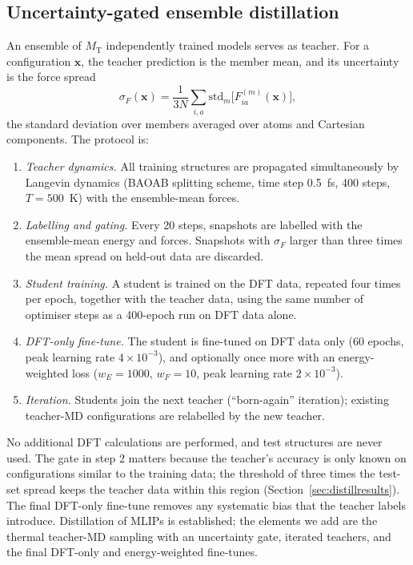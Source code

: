 \documentclass[journal=jctcce,manuscript=article,layout=traditional]{achemso}
\newcommand{\vect}[1]{\bm{#1}}
\begin{document}
\subsection{Uncertainty-gated ensemble distillation}
\label{sec:distill}
An ensemble of $M_\text{T}$ independently trained models serves as teacher. For a configuration $\vect x$, the
teacher prediction is the member mean, and its uncertainty is the force spread
\begin{equation}
\sigma_F(\vect x)=\frac{1}{3N}\sum_{i,a}\mathrm{std}_m\big[F^{(m)}_{ia}(\vect x)\big],
\end{equation}
the standard deviation over members averaged over atoms and Cartesian components. The protocol is:
\begin{enumerate}
\item \emph{Teacher dynamics.} All training structures are propagated simultaneously by Langevin dynamics
(BAOAB splitting scheme\cite{leimkuhler2013baoab}, time step 0.5~fs, 400 steps, $T=500$~K) with the ensemble-mean forces.
\item \emph{Labelling and gating.} Every 20 steps, snapshots are labelled with the ensemble-mean energy and forces.
Snapshots with $\sigma_F$ larger than three times the mean spread on held-out data are discarded.
\item \emph{Student training.} A student is trained on the DFT data, repeated four times per epoch, together with the
teacher data, using the same number of optimiser steps as a 400-epoch run on DFT data alone.
\item \emph{DFT-only fine-tune.} The student is fine-tuned on DFT data only (60 epochs, peak learning rate
$4\times10^{-3}$), and optionally once more with an energy-weighted loss ($w_E=1000$, $w_F=10$, peak learning rate
$2\times10^{-3}$).
\item \emph{Iteration.} Students join the next teacher (``born-again'' iteration\cite{furlanello2018}); existing
teacher-MD configurations are relabelled by the new teacher.
\end{enumerate}
No additional DFT calculations are performed, and test structures are never used. The gate in step 2 matters
because the teacher's accuracy is only known on configurations similar to the training data; the threshold of three
times the test-set spread keeps the teacher data within this region (Section~\ref{sec:distillresults}). The final
DFT-only fine-tune removes any systematic bias that the teacher labels introduce. Distillation of MLIPs is
established\cite{hinton2015distill,gardner2025distill,grace2025distill}; the elements we add are the thermal
teacher-MD sampling with an uncertainty gate, iterated teachers, and the final DFT-only and energy-weighted
fine-tunes.
\end{document}
